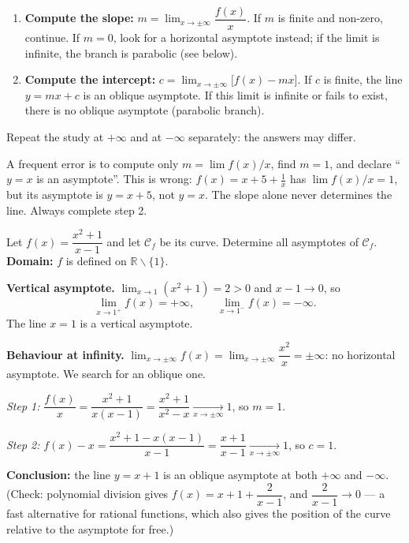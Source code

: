\documentclass[11pt]{article}
\def\setminus{\mathbin{\backslash}}\let\smallsetminus\setminus
\begin{document}
\begin{methode}
\begin{enumerate}
\item \textbf{Compute the slope:} $m=\displaystyle\lim_{x\to\pm\infty}\dfrac{f(x)}{x}$. If $m$ is finite and non-zero, continue. If $m=0$, look for a horizontal asymptote instead; if the limit is infinite, the branch is parabolic (see below).
\item \textbf{Compute the intercept:} $c=\displaystyle\lim_{x\to\pm\infty}\bigl[f(x)-mx\bigr]$. If $c$ is finite, the line $y=mx+c$ is an oblique asymptote. If this limit is infinite or fails to exist, there is no oblique asymptote (parabolic branch).
\end{enumerate}
Repeat the study at $+\infty$ and at $-\infty$ separately: the answers may differ.
\end{methode}

\begin{attention}
A frequent error is to compute only $m=\lim f(x)/x$, find $m=1$, and declare ``$y=x$ is an asymptote''. This is wrong: $f(x)=x+5+\tfrac{1}{x}$ has $\lim f(x)/x=1$, but its asymptote is $y=x+5$, not $y=x$. The slope alone never determines the line. Always complete step 2.
\end{attention}

\begin{exoresolu}
Let $f(x)=\dfrac{x^{2}+1}{x-1}$ and let $\mathcal{C}_f$ be its curve. Determine all asymptotes of $\mathcal{C}_f$.
\tcblower
\textbf{Domain:} $f$ is defined on $\mathbb{R}\setminus\{1\}$.

\textbf{Vertical asymptote.} $\lim_{x\to 1}(x^2+1)=2>0$ and $x-1\to 0$, so
\[ \lim_{x\to 1^{+}}f(x)=+\infty, \qquad \lim_{x\to 1^{-}}f(x)=-\infty. \]
The line $x=1$ is a vertical asymptote.

\textbf{Behaviour at infinity.} $\lim_{x\to\pm\infty}f(x)=\lim_{x\to\pm\infty}\dfrac{x^{2}}{x}=\pm\infty$: no horizontal asymptote. We search for an oblique one.

\emph{Step 1:} $\dfrac{f(x)}{x}=\dfrac{x^{2}+1}{x(x-1)}=\dfrac{x^{2}+1}{x^{2}-x}\xrightarrow[x\to\pm\infty]{}1$, so $m=1$.

\emph{Step 2:} $f(x)-x=\dfrac{x^{2}+1-x(x-1)}{x-1}=\dfrac{x+1}{x-1}\xrightarrow[x\to\pm\infty]{}1$, so $c=1$.

\textbf{Conclusion:} the line $y=x+1$ is an oblique asymptote at both $+\infty$ and $-\infty$. (Check: polynomial division gives $f(x)=x+1+\dfrac{2}{x-1}$, and $\dfrac{2}{x-1}\to 0$ — a fast alternative for rational functions, which also gives the position of the curve relative to the asymptote for free.)
\end{exoresolu}
\end{document}
